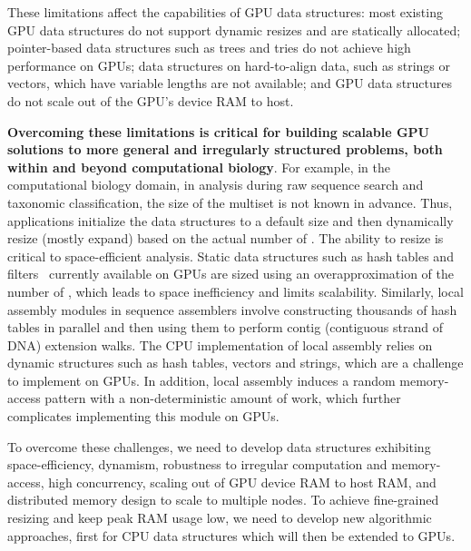 These limitations affect the capabilities of GPU data structures: most existing GPU data structures do not support dynamic resizes and are statically allocated; pointer-based data structures such as trees and tries do not achieve high performance on GPUs; data structures on hard-to-align data, such as strings or vectors, which have variable lengths are not available; and GPU data structures do not scale out of the GPU's device RAM to host.

\textbf{Overcoming these limitations is critical for building scalable GPU solutions to more general and irregularly structured problems, both within and beyond computational biology}. For example, in the computational biology domain, in \kmer analysis during raw sequence search and taxonomic classification, the size of the \kmer multiset is not known in advance. Thus, applications initialize the data structures to a default size and then dynamically resize (mostly expand) based on the actual number of \kmers. The ability to resize is critical to space-efficient \kmer analysis. Static data structures such as hash tables and filters~\cite{GeilFO18} currently available on GPUs are sized using an overapproximation of the number of \kmers, which leads to space inefficiency and limits scalability.
Similarly, local assembly modules in sequence assemblers involve constructing thousands of hash tables in parallel and then using them to perform contig (contiguous strand of DNA) extension walks. The CPU implementation of local assembly relies on dynamic structures such as hash tables, vectors and strings, which are a challenge to implement on GPUs. In addition, local assembly induces a random memory-access pattern with a non-deterministic amount of work, which further complicates implementing this module on GPUs.

To overcome these challenges, we need to develop data structures exhibiting space-efficiency, dynamism, robustness to irregular computation and memory-access, high concurrency, scaling out of GPU device RAM to host RAM, and distributed memory design to scale to multiple nodes.
To achieve fine-grained resizing and keep peak RAM usage low, we need to develop new algorithmic approaches, first for CPU data structures which will then be extended to GPUs.



